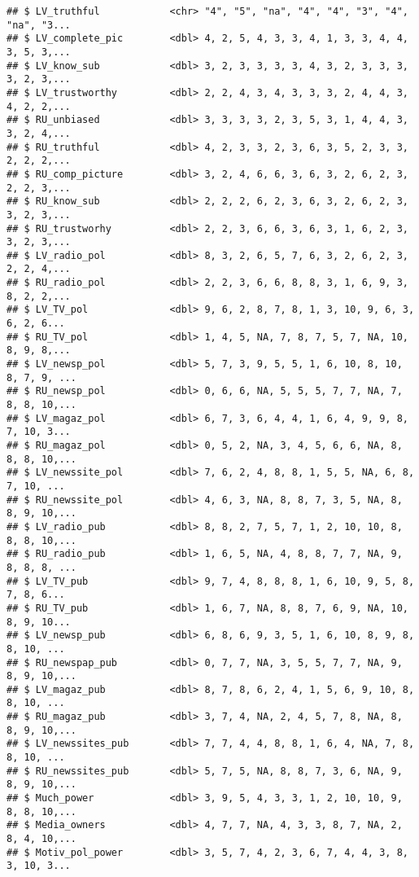 \documentclass[
]{article}
\begin{document}
\begin{verbatim}
## $ LV_truthful            <chr> "4", "5", "na", "4", "4", "3", "4", "na", "3...
## $ LV_complete_pic        <dbl> 4, 2, 5, 4, 3, 3, 4, 1, 3, 3, 4, 4, 3, 5, 3,...
## $ LV_know_sub            <dbl> 3, 2, 3, 3, 3, 3, 4, 3, 2, 3, 3, 3, 3, 2, 3,...
## $ LV_trustworthy         <dbl> 2, 2, 4, 3, 4, 3, 3, 3, 2, 4, 4, 3, 4, 2, 2,...
## $ RU_unbiased            <dbl> 3, 3, 3, 3, 2, 3, 5, 3, 1, 4, 4, 3, 3, 2, 4,...
## $ RU_truthful            <dbl> 4, 2, 3, 3, 2, 3, 6, 3, 5, 2, 3, 3, 2, 2, 2,...
## $ RU_comp_picture        <dbl> 3, 2, 4, 6, 6, 3, 6, 3, 2, 6, 2, 3, 2, 2, 3,...
## $ RU_know_sub            <dbl> 2, 2, 2, 6, 2, 3, 6, 3, 2, 6, 2, 3, 3, 2, 3,...
## $ RU_trustworhy          <dbl> 2, 2, 3, 6, 6, 3, 6, 3, 1, 6, 2, 3, 3, 2, 3,...
## $ LV_radio_pol           <dbl> 8, 3, 2, 6, 5, 7, 6, 3, 2, 6, 2, 3, 2, 2, 4,...
## $ RU_radio_pol           <dbl> 2, 2, 3, 6, 6, 8, 8, 3, 1, 6, 9, 3, 8, 2, 2,...
## $ LV_TV_pol              <dbl> 9, 6, 2, 8, 7, 8, 1, 3, 10, 9, 6, 3, 6, 2, 6...
## $ RU_TV_pol              <dbl> 1, 4, 5, NA, 7, 8, 7, 5, 7, NA, 10, 8, 9, 8,...
## $ LV_newsp_pol           <dbl> 5, 7, 3, 9, 5, 5, 1, 6, 10, 8, 10, 8, 7, 9, ...
## $ RU_newsp_pol           <dbl> 0, 6, 6, NA, 5, 5, 5, 7, 7, NA, 7, 8, 8, 10,...
## $ LV_magaz_pol           <dbl> 6, 7, 3, 6, 4, 4, 1, 6, 4, 9, 9, 8, 7, 10, 3...
## $ RU_magaz_pol           <dbl> 0, 5, 2, NA, 3, 4, 5, 6, 6, NA, 8, 8, 8, 10,...
## $ LV_newssite_pol        <dbl> 7, 6, 2, 4, 8, 8, 1, 5, 5, NA, 6, 8, 7, 10, ...
## $ RU_newssite_pol        <dbl> 4, 6, 3, NA, 8, 8, 7, 3, 5, NA, 8, 8, 9, 10,...
## $ LV_radio_pub           <dbl> 8, 8, 2, 7, 5, 7, 1, 2, 10, 10, 8, 8, 8, 10,...
## $ RU_radio_pub           <dbl> 1, 6, 5, NA, 4, 8, 8, 7, 7, NA, 9, 8, 8, 8, ...
## $ LV_TV_pub              <dbl> 9, 7, 4, 8, 8, 8, 1, 6, 10, 9, 5, 8, 7, 8, 6...
## $ RU_TV_pub              <dbl> 1, 6, 7, NA, 8, 8, 7, 6, 9, NA, 10, 8, 9, 10...
## $ LV_newsp_pub           <dbl> 6, 8, 6, 9, 3, 5, 1, 6, 10, 8, 9, 8, 8, 10, ...
## $ RU_newspap_pub         <dbl> 0, 7, 7, NA, 3, 5, 5, 7, 7, NA, 9, 8, 9, 10,...
## $ LV_magaz_pub           <dbl> 8, 7, 8, 6, 2, 4, 1, 5, 6, 9, 10, 8, 8, 10, ...
## $ RU_magaz_pub           <dbl> 3, 7, 4, NA, 2, 4, 5, 7, 8, NA, 8, 8, 9, 10,...
## $ LV_newssites_pub       <dbl> 7, 7, 4, 4, 8, 8, 1, 6, 4, NA, 7, 8, 8, 10, ...
## $ RU_newssites_pub       <dbl> 5, 7, 5, NA, 8, 8, 7, 3, 6, NA, 9, 8, 9, 10,...
## $ Much_power             <dbl> 3, 9, 5, 4, 3, 3, 1, 2, 10, 10, 9, 8, 8, 10,...
## $ Media_owners           <dbl> 4, 7, 7, NA, 4, 3, 3, 8, 7, NA, 2, 8, 4, 10,...
## $ Motiv_pol_power        <dbl> 3, 5, 7, 4, 2, 3, 6, 7, 4, 4, 3, 8, 3, 10, 3...

\end{verbatim}
\end{document}
